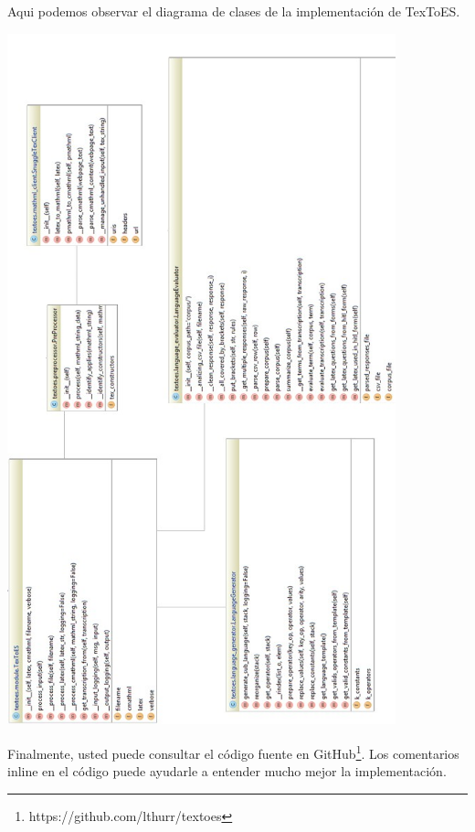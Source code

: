 Aqui podemos observar el diagrama de clases de la implementación de TexToES.

\includegraphics[width=11.24cm, height=20cm]{figures/diagram.jpg}

Finalmente, usted puede consultar el código fuente en GitHub\footnote{https://github.com/lthurr/textoes}. Los comentarios inline en el código puede ayudarle a entender mucho mejor la implementación.
